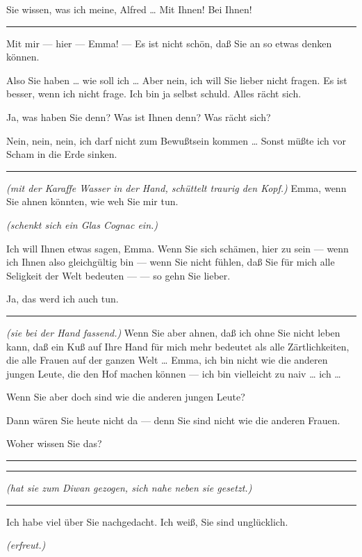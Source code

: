 \documentclass[
	final,
	a4paper,
	ngerman,
	mpinclude = true, %
	twoside = true,
	open = right,
	cleardoublepage = plain,
	DIV = 13,
	BCOR = 1cm,
	titlepage = firstiscover,
	]{scrbook}
\newcommand{\direction}[1]{\textit{(#1)}}
\newenvironment{deletion}{%
		\vspace{0.25\baselineskip}
		\hrule
		\vspace{0.25\baselineskip}
		\color{darkgray}
	}{
		\color{black}
		\vspace{0.25\baselineskip}
		\hrule 
		\vspace{0.25\baselineskip}
	}
\newcommand{\thecharacter}[1]{\textup{\textsc{#1}}\xspace}
\newcommand{\theherr}{\thecharacter{Junger Herr}}
\newcommand{\thefrau}{\thecharacter{Junge Frau}}
\newcommand{\character}[1]{\item[#1:]}
\newcommand{\herr}{\character{\theherr}}
\newcommand{\frau}{\character{\thefrau}}
\begin{document}
\begin{play}
	\frau
	Sie wissen, was ich meine, Alfred \ldots{} Mit Ihnen! Bei Ihnen!

	\begin{deletion}
	\herr
	Mit mir --- hier --- Emma! --- Es ist nicht schön, daß Sie an so etwas denken können.

	\frau
	Also Sie haben \ldots{} wie soll ich \ldots{} Aber nein, ich will Sie lieber nicht fragen. Es ist besser, wenn ich nicht frage. Ich bin ja selbst schuld. Alles rächt sich.

	\herr
	Ja, was haben Sie denn? Was ist Ihnen denn? Was rächt sich?

	\frau
	Nein, nein, nein, ich darf nicht zum Bewußtsein kommen \ldots{} Sonst müßte ich vor Scham in die Erde sinken.
	\end{deletion}

	\herr
	\direction{mit der Karaffe Wasser in der Hand, schüttelt traurig den Kopf.} Emma, wenn Sie ahnen könnten, wie weh Sie mir tun.

	\frau
	\direction{schenkt sich ein Glas Cognac ein.}

	\herr
	Ich will Ihnen etwas sagen, Emma. Wenn Sie sich schämen, hier zu sein --- wenn ich Ihnen also gleichgültig bin --- wenn Sie nicht fühlen, daß Sie für mich alle Seligkeit der Welt bedeuten --- --- so gehn Sie lieber.

	\frau
	Ja, das werd ich auch tun.

	\begin{deletion}
	\herr
	\direction{sie bei der Hand fassend.} Wenn Sie aber ahnen, daß ich ohne Sie nicht leben kann, daß ein Kuß auf Ihre Hand für mich mehr bedeutet als alle Zärtlichkeiten, die alle Frauen auf der ganzen Welt \ldots{} Emma, ich bin nicht wie die anderen jungen Leute, die den Hof machen können --- ich bin vielleicht zu naiv \ldots{} ich \ldots{}

	\frau
	Wenn Sie aber doch sind wie die anderen jungen Leute?

	\herr
	Dann wären Sie heute nicht da --- denn Sie sind nicht wie die anderen Frauen.

	\frau
	Woher wissen Sie das?
	\end{deletion}

	\herr
	\begin{deletion}
		\direction{hat sie zum Diwan gezogen, sich nahe neben sie gesetzt.}
	\end{deletion}
	Ich habe viel über Sie nachgedacht. Ich weiß, Sie sind unglücklich.

	\frau
	\direction{erfreut.}


\end{play}
\end{document}
